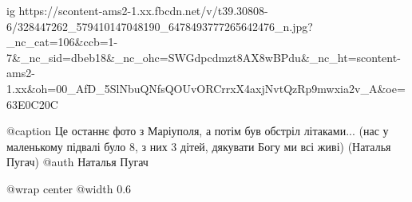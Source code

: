  
 
 
 
 


\ifcmt
  ig https://scontent-ams2-1.xx.fbcdn.net/v/t39.30808-6/328447262_579410147048190_6478493777265642476_n.jpg?_nc_cat=106&ccb=1-7&_nc_sid=dbeb18&_nc_ohc=SWGdpcdmzt8AX8wBPdu&_nc_ht=scontent-ams2-1.xx&oh=00_AfD_5SlNbuQNfsQOUvORCrrxX4axjNvtQzRp9mwxia2v_A&oe=63E0C20C

  @caption Це останнє фото з Маріуполя, а потім був обстріл літаками... (нас у маленькому підвалі було 8, з них 3 дітей, дякувати Богу ми всі живі) (Наталья Пугач)
	@auth Наталья Пугач

  @wrap center
  @width 0.6
\fi
